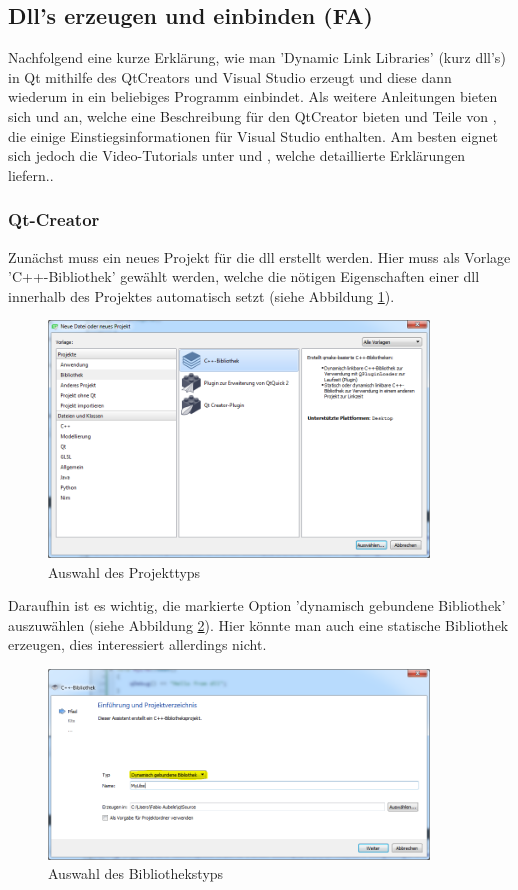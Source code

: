 \subsection{Dll's erzeugen und einbinden (FA)}
\label{DLLs_HOWTO}
Nachfolgend eine kurze Erklärung, wie man 'Dynamic Link Libraries' (kurz dll's) in Qt mithilfe des QtCreators und Visual Studio erzeugt und diese dann wiederum in ein beliebiges Programm einbindet. Als weitere Anleitungen bieten sich \cite{Dll_1} und \cite{Dll_2} an, welche eine Beschreibung für den QtCreator bieten und Teile von \cite{Dll_3}, die einige Einstiegsinformationen für Visual Studio enthalten. Am besten eignet sich jedoch die Video-Tutorials unter \cite{Dll_4} und \cite{Dll_5}, welche detaillierte Erklärungen liefern..

\subsubsection{Qt-Creator}
Zunächst muss ein neues Projekt für die dll erstellt werden. Hier muss als Vorlage 'C++-Bibliothek' gewählt werden, welche die nötigen Eigenschaften einer dll innerhalb des Projektes automatisch setzt (siehe Abbildung \ref{fig:proj}). \newline
\begin{figure}[H]
	\centering
	\includegraphics[width=0.90\textwidth]{figures/qtProjekt.png}
	\caption{Auswahl des Projekttyps}
	\label{fig:proj}
\end{figure}
Daraufhin ist es wichtig, die markierte Option 'dynamisch gebundene Bibliothek' auszuwählen (siehe Abbildung \ref{fig:bib}). Hier könnte man auch eine statische Bibliothek erzeugen, dies interessiert allerdings nicht.
\begin{figure}[H]
	\centering
	\includegraphics[width=0.90\textwidth]{figures/qtAuswahl.png}
	\caption{Auswahl des Bibliothekstyps}
	\label{fig:bib}
\end{figure}
